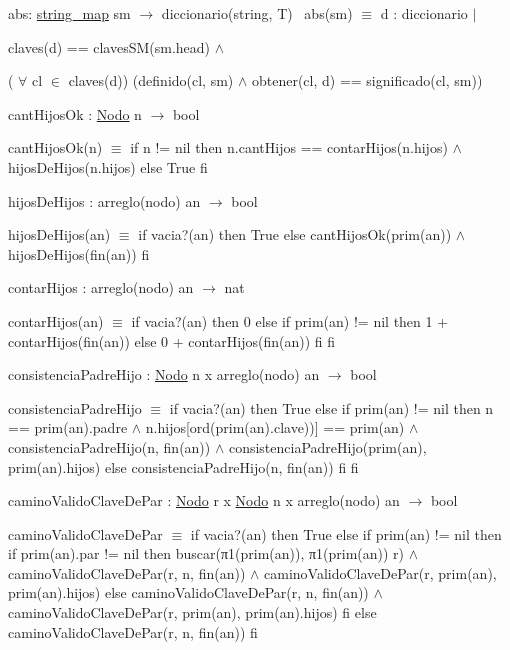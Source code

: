 abs\+: \mbox{\hyperlink{classstring__map}{string\+\_\+map}} sm $\to$ diccionario(string, T)~\newline
abs(sm) $\equiv$ d \+: diccionario $|$
\begin{DoxyItemize}
\item claves(d) == claves\+SM(sm.\+head) $\land$
\item ( $\forall$ cl $\in$ claves(d)) (definido(cl, sm) $\land$ obtener(cl, d) == significado(cl, sm))
\end{DoxyItemize}

cant\+Hijos\+Ok \+: \mbox{\hyperlink{structstring__map_1_1Nodo}{Nodo}} n $\to$ bool

cant\+Hijos\+Ok(n) $\equiv$ if n != nil then n.\+cant\+Hijos == contar\+Hijos(n.\+hijos) $\land$ hijos\+De\+Hijos(n.\+hijos) else True fi

hijos\+De\+Hijos \+: arreglo(nodo) an $\to$ bool

hijos\+De\+Hijos(an) $\equiv$ if vacia?(an) then True else cant\+Hijos\+Ok(prim(an)) $\land$ hijos\+De\+Hijos(fin(an)) fi

contar\+Hijos \+: arreglo(nodo) an $\to$ nat

contar\+Hijos(an) $\equiv$ if vacia?(an) then 0 else if prim(an) != nil then 1 + contar\+Hijos(fin(an)) else 0 + contar\+Hijos(fin(an)) fi fi

consistencia\+Padre\+Hijo \+: \mbox{\hyperlink{structstring__map_1_1Nodo}{Nodo}} n x arreglo(nodo) an $\to$ bool

consistencia\+Padre\+Hijo $\equiv$ if vacia?(an) then True else if prim(an) != nil then n == prim(an).padre $\land$ n.\+hijos\mbox{[}ord(prim(an).clave))\mbox{]} == prim(an) $\land$ consistencia\+Padre\+Hijo(n, fin(an)) $\land$ consistencia\+Padre\+Hijo(prim(an), prim(an).hijos) else consistencia\+Padre\+Hijo(n, fin(an)) fi fi

camino\+Valido\+Clave\+De\+Par \+: \mbox{\hyperlink{structstring__map_1_1Nodo}{Nodo}} r x \mbox{\hyperlink{structstring__map_1_1Nodo}{Nodo}} n x arreglo(nodo) an $\to$ bool

camino\+Valido\+Clave\+De\+Par $\equiv$ if vacia?(an) then True else if prim(an) != nil then if prim(an).par != nil then buscar(π1(prim(an)), π1(prim(an)) r) $\land$ camino\+Valido\+Clave\+De\+Par(r, n, fin(an)) $\land$ camino\+Valido\+Clave\+De\+Par(r, prim(an), prim(an).hijos) else camino\+Valido\+Clave\+De\+Par(r, n, fin(an)) $\land$ camino\+Valido\+Clave\+De\+Par(r, prim(an), prim(an).hijos) fi else camino\+Valido\+Clave\+De\+Par(r, n, fin(an)) fi

